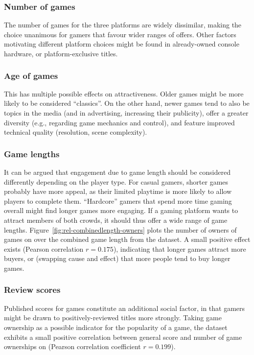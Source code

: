 \subsubsection{Number of games} The number of games for the three platforms are widely dissimilar, making the choice unanimous for gamers that favour wider ranges of offers. Other factors motivating different platform choices might be found in already-owned console hardware, or platform-exclusive titles.

\subsubsection{Age of games} This has multiple possible effects on attractiveness. Older games might be more likely to be considered ``classics''. On the other hand, newer games tend to also be topics in the media (and in advertising, increasing their publicity), offer a greater diversity (e.g., regarding game mechanics and control), %
and feature improved technical quality (resolution, scene complexity).

\subsubsection{Game lengths} It can be argued that engagement due to game length should be considered differently depending on the player type. For casual gamers, shorter games probably have more appeal, as their limited playtime is more likely to allow players to complete them. ``Hardcore'' gamers that spend more time gaming overall might find longer games more engaging. If a gaming platform wants to attract members of both crowds, it should thus offer a wide range of game lengths. Figure~\ref{fig:rel-combinedlength-owners} plots the number of owners of games on \steam over the combined game length from the \hltb dataset. A small positive effect exists (Pearson correlation $r = 0.175$), indicating that longer games attract more buyers, or (swapping cause and effect) that more people tend to buy longer games.

\subsubsection{Review scores} Published scores for games constitute an additional social factor, in that gamers might be drawn to positively-reviewed titles more strongly. Taking game ownership as a possible indicator for the popularity of a game, the \metacritic dataset exhibits a small positive correlation between general score and number of game ownerships on \steam (Pearson correlation coefficient $r = 0.199$).


